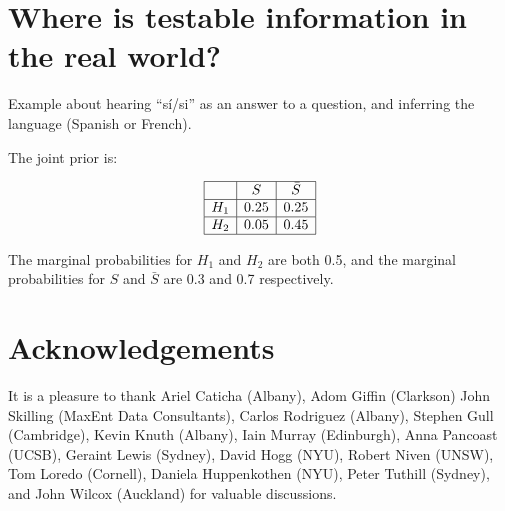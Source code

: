 \documentclass[a4paper, 11pt]{article}
\begin{document}
\section{Where is testable information in the real world?}

Example about hearing ``sí/si'' as an answer to a question,
and inferring the language (Spanish or French).

The joint prior is:

\begin{eqnarray}
\begin{array}{|c|c|c|}
\hline
	&	S	& \bar{S}\\
\hline
H_1 & 0.25  & 0.25\\
\hline
H_2 & 0.05 & 0.45\\
\hline
\end{array}
\end{eqnarray}

The marginal probabilities for $H_1$ and $H_2$ are both 0.5, and the
marginal probabilities for $S$ and $\bar{S}$ are 0.3 and 0.7 respectively.



\section*{Acknowledgements}
It is a pleasure to thank
Ariel Caticha (Albany),
Adom Giffin (Clarkson)
John Skilling (MaxEnt Data Consultants),
Carlos Rodriguez (Albany),
Stephen Gull (Cambridge),
Kevin Knuth (Albany),
Iain Murray (Edinburgh),
Anna Pancoast (UCSB),
Geraint Lewis (Sydney),
David Hogg (NYU),
Robert Niven (UNSW),
Tom Loredo (Cornell),
Daniela Huppenkothen (NYU),
Peter Tuthill (Sydney),
and John Wilcox (Auckland)
for valuable discussions.
\end{document}
